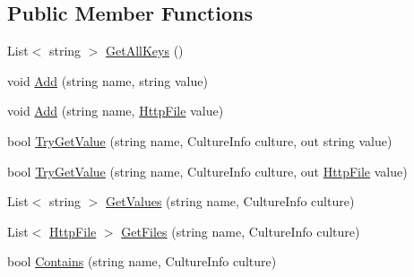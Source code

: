 \subsection*{Public Member Functions}
\begin{DoxyCompactItemize}
\item 
List$<$ string $>$ \hyperlink{classCqrs_1_1WebApi_1_1Formatters_1_1FormMultipart_1_1Infrastructure_1_1FormData_a0fe5f9fb07740a743348badb244980a4}{Get\+All\+Keys} ()
\item 
void \hyperlink{classCqrs_1_1WebApi_1_1Formatters_1_1FormMultipart_1_1Infrastructure_1_1FormData_a901e35133be31392947951d78632e593}{Add} (string name, string value)
\item 
void \hyperlink{classCqrs_1_1WebApi_1_1Formatters_1_1FormMultipart_1_1Infrastructure_1_1FormData_a11d2a07d1ba691b35ee3b3e553c040ba}{Add} (string name, \hyperlink{classCqrs_1_1WebApi_1_1Formatters_1_1FormMultipart_1_1Infrastructure_1_1HttpFile}{Http\+File} value)
\item 
bool \hyperlink{classCqrs_1_1WebApi_1_1Formatters_1_1FormMultipart_1_1Infrastructure_1_1FormData_ac4a6a0575ca53bd9fdd35537e0421575}{Try\+Get\+Value} (string name, Culture\+Info culture, out string value)
\item 
bool \hyperlink{classCqrs_1_1WebApi_1_1Formatters_1_1FormMultipart_1_1Infrastructure_1_1FormData_a0e75225cc7dc6292c4288924bcb23f62}{Try\+Get\+Value} (string name, Culture\+Info culture, out \hyperlink{classCqrs_1_1WebApi_1_1Formatters_1_1FormMultipart_1_1Infrastructure_1_1HttpFile}{Http\+File} value)
\item 
List$<$ string $>$ \hyperlink{classCqrs_1_1WebApi_1_1Formatters_1_1FormMultipart_1_1Infrastructure_1_1FormData_afee05e0f8f3d7752bd8feb168e68428b}{Get\+Values} (string name, Culture\+Info culture)
\item 
List$<$ \hyperlink{classCqrs_1_1WebApi_1_1Formatters_1_1FormMultipart_1_1Infrastructure_1_1HttpFile}{Http\+File} $>$ \hyperlink{classCqrs_1_1WebApi_1_1Formatters_1_1FormMultipart_1_1Infrastructure_1_1FormData_af38e78af3402d92c6bb4c85ebe60fc55}{Get\+Files} (string name, Culture\+Info culture)
\item 
bool \hyperlink{classCqrs_1_1WebApi_1_1Formatters_1_1FormMultipart_1_1Infrastructure_1_1FormData_ae43d8a31fa56a669756b97724bf0703b}{Contains} (string name, Culture\+Info culture)
\end{DoxyCompactItemize}
